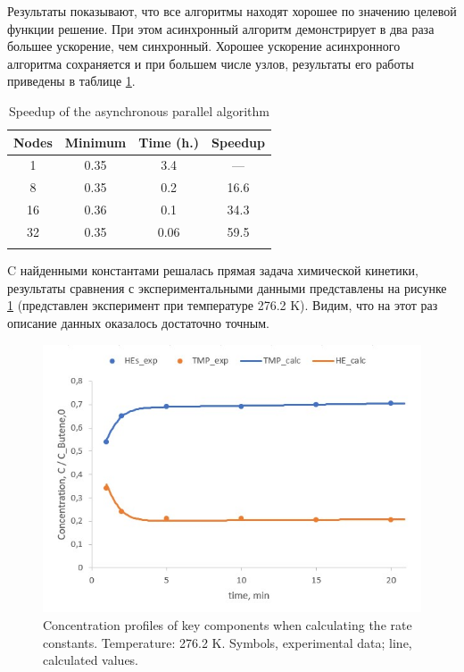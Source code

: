 \documentclass{svproc}
\begin{document}
Результаты показывают, что все алгоритмы находят хорошее по значению целевой функции решение. При этом асинхронный алгоритм демонстрирует в два раза большее ускорение, чем синхронный. Хорошее ускорение асинхронного алгоритма сохраняется и при большем числе узлов, результаты его работы приведены в таблице \ref{tab_parall}.

\begin{table}
\caption{Speedup of the asynchronous parallel algorithm}
\label{tab_parall}
\begin{center}
\begin{tabular}{cccc}
\hline\noalign{\smallskip}
Nodes  & Minimum  & Time (h.) & Speedup \\
\hline\noalign{\smallskip}
1  & 0.35   &   3.4     &   ---        \\
8  & 0.35   &   0.2     &   16.6       \\
16 & 0.36   &   0.1     &   34.3       \\
32 & 0.35   &   0.06    &   59.5       \\
\noalign{\smallskip}\hline
\end{tabular}\end{center}\end{table}

C найденными константами решалась прямая задача химической кинетики, результаты сравнения с экспериментальными данными представлены на рисунке \ref{fig:res2} (представлен эксперимент при температуре 276.2 K). Видим, что на этот раз описание данных оказалось достаточно точным.

\begin{figure}
\begin{center}
  \includegraphics[width=0.7\linewidth]{res2.jpg}
  \caption{Concentration profiles of key components when calculating the rate constants. Temperature: 276.2 K. Symbols, experimental data; line, calculated values.}
  \label{fig:res2}  
\end{center}
\end{figure}
\end{document}
